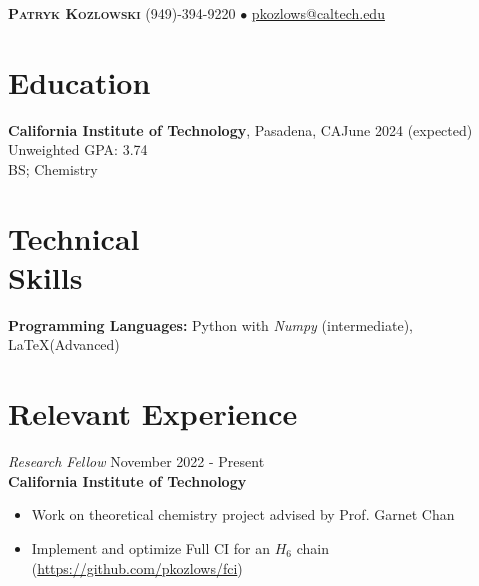 \documentclass[margin,line]{resume}
\begin{document}
{\Large \textbf{\scshape Patryk Kozlowski}
\normalsize
\hspace{70mm}(949)-394-9220 $\bullet$ \url{pkozlows@caltech.edu}
}
\begin{resume}

\section{\mysidestyle Education}
\textbf{California Institute of Technology}, Pasadena, CA\hfill June 2024 (expected)\\
Unweighted GPA: 3.74\\
BS; Chemistry

\section{\mysidestyle Technical\\ Skills}
\textbf{Programming Languages:} Python with \emph{Numpy} (intermediate), \LaTeX  (Advanced)

\section{\mysidestyle Relevant Experience}
{\sl Research Fellow} \hfill November 2022 - Present\\
\textbf{California Institute of Technology}
\begin{itemize}
\item Work on theoretical chemistry project advised by Prof. Garnet Chan
\item Implement and optimize Full CI for an $H_{6}$ chain (\url{https://github.com/pkozlows/fci})

\end{itemize}


\end{resume}
\end{document}
